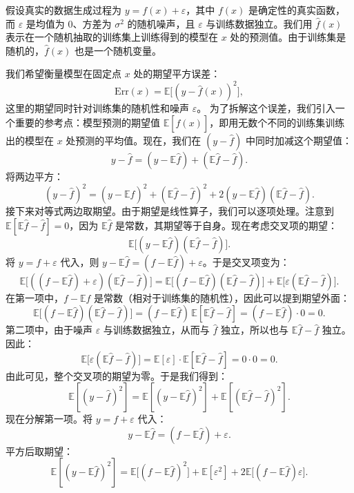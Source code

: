 \documentclass[lang=cn,zihao=-4,a4paper,fontset=windows]{beautybook}
\begin{document}
假设真实的数据生成过程为 \(y = f(x) + \varepsilon\)，其中 \(f(x)\) 是确定性的真实函数，而 \(\varepsilon\) 是均值为 \(0\)、方差为 \(\sigma^2\) 的随机噪声，且 \(\varepsilon\) 与训练数据独立。我们用 \(\hat{f}(x)\) 表示在一个随机抽取的训练集上训练得到的模型在 \(x\) 处的预测值。由于训练集是随机的，\(\hat{f}(x)\) 也是一个随机变量。

我们希望衡量模型在固定点 \(x\) 处的期望平方误差：
\[
\text{Err}(x) = \mathbb{E}\big[(y - \hat{f}(x))^2\big],
\]
这里的期望同时针对训练集的随机性和噪声 \(\varepsilon\)。
为了拆解这个误差，我们引入一个重要的参考点：模型预测的期望值 \(\mathbb{E}[\hat{f}(x)]\)，即用无数个不同的训练集训练出的模型在 \(x\) 处预测的平均值。现在，我们在 \((y - \hat{f})\) 中同时加减这个期望值：
\[
y - \hat{f} = (y - \mathbb{E}\hat{f}) + (\mathbb{E}\hat{f} - \hat{f}).
\]
将两边平方：
\[
(y - \hat{f})^2 = (y - \mathbb{E}\hat{f})^2 + (\mathbb{E}\hat{f} - \hat{f})^2 + 2(y - \mathbb{E}\hat{f})(\mathbb{E}\hat{f} - \hat{f}).
\]
接下来对等式两边取期望。由于期望是线性算子，我们可以逐项处理。注意到 \(\mathbb{E}[\mathbb{E}\hat{f} - \hat{f}] = 0\)，因为 \(\mathbb{E}\hat{f}\) 是常数，其期望等于自身。现在考虑交叉项的期望：
\[
\mathbb{E}\big[(y - \mathbb{E}\hat{f})(\mathbb{E}\hat{f} - \hat{f})\big].
\]
将 \(y = f + \varepsilon\) 代入，则 \(y - \mathbb{E}\hat{f} = (f - \mathbb{E}\hat{f}) + \varepsilon\)。于是交叉项变为：
\[
\mathbb{E}\big[((f - \mathbb{E}\hat{f}) + \varepsilon)(\mathbb{E}\hat{f} - \hat{f})\big] = \mathbb{E}\big[(f - \mathbb{E}\hat{f})(\mathbb{E}\hat{f} - \hat{f})\big] + \mathbb{E}\big[\varepsilon(\mathbb{E}\hat{f} - \hat{f})\big].
\]
在第一项中，\(f - \mathbb{E}\hat{f}\) 是常数（相对于训练集的随机性），因此可以提到期望外面：
\[
\mathbb{E}\big[(f - \mathbb{E}\hat{f})(\mathbb{E}\hat{f} - \hat{f})\big] = (f - \mathbb{E}\hat{f})\,\mathbb{E}[\mathbb{E}\hat{f} - \hat{f}] = (f - \mathbb{E}\hat{f})\cdot 0 = 0.
\]
第二项中，由于噪声 \(\varepsilon\) 与训练数据独立，从而与 \(\hat{f}\) 独立，所以也与 \(\mathbb{E}\hat{f} - \hat{f}\) 独立。因此：
\[
\mathbb{E}\big[\varepsilon(\mathbb{E}\hat{f} - \hat{f})\big] = \mathbb{E}[\varepsilon] \cdot \mathbb{E}[\mathbb{E}\hat{f} - \hat{f}] = 0 \cdot 0 = 0.
\]
由此可见，整个交叉项的期望为零。于是我们得到：
\[
\mathbb{E}[(y - \hat{f})^2] = \mathbb{E}[(y - \mathbb{E}\hat{f})^2] + \mathbb{E}[(\mathbb{E}\hat{f} - \hat{f})^2].
\]
现在分解第一项。将 \(y = f + \varepsilon\) 代入：
\[
y - \mathbb{E}\hat{f} = (f - \mathbb{E}\hat{f}) + \varepsilon.
\]
平方后取期望：
\[
\mathbb{E}[(y - \mathbb{E}\hat{f})^2] = \mathbb{E}\big[(f - \mathbb{E}\hat{f})^2\big] + \mathbb{E}[\varepsilon^2] + 2\mathbb{E}\big[(f - \mathbb{E}\hat{f})\varepsilon\big].
\]
\end{document}
